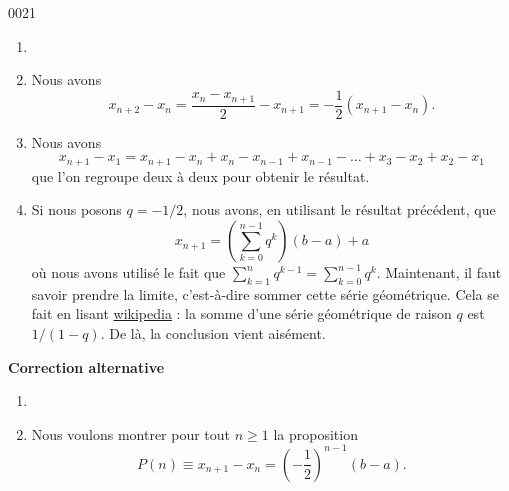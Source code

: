 
\begin{corrige}{0021}

\begin{enumerate}
\item {}
\item Nous avons
\begin{equation}
	x_{n+2}-x_n=\frac{ x_n-x_{n+1} }{ 2 }-x_{n+1}=-\frac{1}{ 2 }(x_{n+1}-x_n).
\end{equation}

\item 
Nous avons
\begin{equation}
	x_{n+1}-x_1=x_{n+1}-x_n+x_n-x_{n-1}+x_{n-1}-\ldots +x_3-x_2+x_2-x_1
\end{equation}
que l'on regroupe deux à deux pour obtenir le résultat.

\item
Si nous posons $q=-1/2$, nous avons, en utilisant le résultat précédent, que
\begin{equation}
	x_{n+1}=\left( \sum_{k=0}^{n-1}q^k \right)(b-a)+a
\end{equation}
où nous avons utilisé le fait que $\sum_{k=1}^nq^{k-1}=\sum_{k=0}^{n-1}q^k$. Maintenant, il faut savoir prendre la limite, c'est-à-dire sommer cette série géométrique. Cela se fait en lisant \href{http://fr.wikipedia.org/wiki/Série_géométrique}{wikipedia} : la somme d'une série géométrique de raison $q$ est $1/(1-q)$. De là, la conclusion vient aisément.

\end{enumerate}

{\bf Correction alternative}

\begin{enumerate}
\item {}

\item
 Nous voulons montrer pour tout $n \geq 1$ la proposition
  \begin{equation*}
    P(n) \equiv x_{n+1} - x_n = {\left(-\frac12\right)}^{n-1} (b-a).
  \end{equation*}


\end{enumerate}
\end{corrige}
